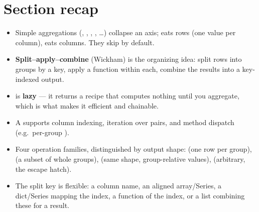 \documentclass[11pt]{article}
\begin{document}
\section*{Section recap}
\begin{itemize}
  \item Simple aggregations (, , , , \ldots) collapse an axis;  eats rows (one value per column),  eats columns. They skip  by default.
  \item \textbf{Split--apply--combine} (Wickham) is the organizing idea: split rows into groups by a key, apply a function within each, combine the results into a key-indexed output.
  \item {} is \textbf{lazy} --- it returns a  recipe that computes nothing until you aggregate, which is what makes it efficient and chainable.
  \item A  supports column indexing, iteration over  pairs, and method dispatch (e.g.\ per-group ).
  \item Four operation families, distinguished by output shape:  (one row per group),  (a subset of whole groups),  (same shape, group-relative values),  (arbitrary, the escape hatch).
  \item The split key is flexible: a column name, an aligned array/Series, a dict/Series mapping the index, a function of the index, or a list combining these for a  result.
\end{itemize}
\end{document}
